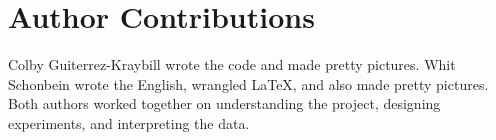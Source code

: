 \section*{Author Contributions}
Colby Guiterrez-Kraybill wrote the code and made pretty pictures. Whit Schonbein wrote the English, wrangled \LaTeX, and also made 
pretty pictures. Both authors worked together on understanding the project, designing experiments, and interpreting the data.



